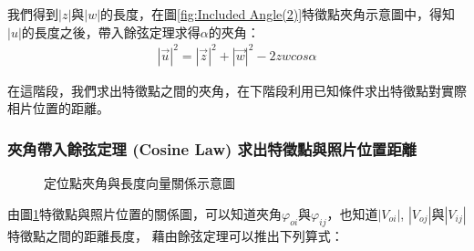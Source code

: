 	我們得到$|z|$與$|w|$的長度，在圖\ref{fig:Included Angle(2)}特徵點夾角示意圖中，得知$|u|$的長度之後，帶入餘弦定理求得$\alpha$的夾角：
	\begin{align}
		|\vec{u}|^2 = |\vec{z}|^2 + |\vec{w}|^2 - 2zwcos\alpha
	\end{align}	
	
	在這階段，我們求出特徵點之間的夾角，在下階段利用已知條件求出特徵點對實際相片位置的距離。
	
	\subsubsection{夾角帶入餘弦定理 (Cosine Law) 求出特徵點與照片位置距離}
	
	\begin{figure}
    \begin{center}
    \end{center}
    \caption{定位點夾角與長度向量關係示意圖}
    \label{fig:Localization Relationship}
    \end{figure}


	由圖\ref{fig:Localization Relationship}特徵點與照片位置的關係圖，可以知道夾角$\varphi _{oi}$與$\varphi _{ij}$，也知道$|V_{oi}|$, $|V_{oj}|$與$|V_{ij}|$特徵點之間的距離長度，
	藉由餘弦定理可以推出下列算式：
	
